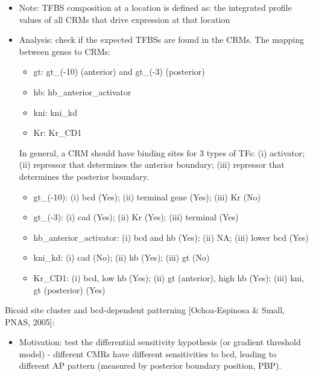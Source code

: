 \documentclass{report}
\begin{document}
\begin{enumerate}
\begin{itemize}
		\item Note: TFBS composition at a location is defined as: the integrated profile values of all CRMs that drive expression at that location		
		
		\item Analysis: check if the expected TFBSs are found in the CRMs. The mapping between genes to CRMs: 
		\begin{itemize}
			\item gt: gt\_(-10) (anterior) and gt\_(-3) (posterior)
			\item hb: hb\_anterior\_activator
			\item kni: kni\_kd
			\item Kr: Kr\_CD1
		\end{itemize}
		In general, a CRM should have binding sites for 3 types of TFs: (i) activator; (ii) repressor that determines the anterior boundary; (iii) repressor that determines the posterior boundary.
		\begin{itemize}
			\item gt\_(-10): (i) bcd (Yes); (ii) terminal gene (Yes); (iii) Kr (No)
			\item gt\_(-3): (i) cad (Yes); (ii) Kr (Yes); (iii) terminal (Yes)
			\item hb\_anterior\_activator: (i) bcd and hb (Yes); (ii) NA; (iii) lower bcd (Yes)
			\item kni\_kd: (i) cad (No); (ii) hb (Yes); (iii) gt (No)
			\item Kr\_CD1: (i) bcd, low hb (Yes); (ii) gt (anterior), high hb (Yes); (iii) kni, gt (posterior) (Yes)
		\end{itemize}
	\end{itemize}
	
	Bicoid site cluster and bcd-dependent patterning [Ochoa-Espinosa \& Small, PNAS, 2005]:
	\begin{itemize}
		\item Motivation: test the differential sensitivity hypothesis (or gradient threshold model) - different CMRs have different sensitivities to bcd, leading to different AP pattern (measured by posterior boundary position, PBP). 
		

\end{itemize}
\end{enumerate}
\end{document}
